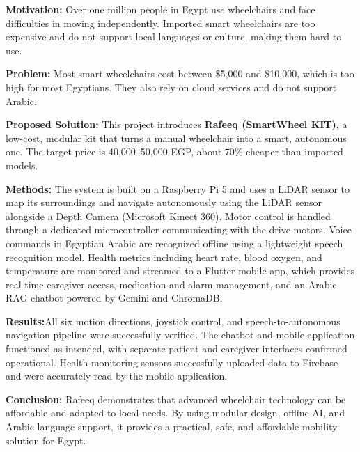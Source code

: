\documentclass[12pt,a4paper]{report}
\begin{document}
\textbf{Motivation:} Over one million people in Egypt use wheelchairs and face difficulties in moving independently. Imported smart wheelchairs are too expensive and do not support local languages or culture, making them hard to use.

\vspace{0.2cm}

\textbf{Problem:} Most smart wheelchairs cost between \$5,000 and \$10,000, which is too high for most Egyptians. They also rely on cloud services and do not support Arabic.

\vspace{0.2cm}

\textbf{Proposed Solution:} This project introduces \textbf{Rafeeq (SmartWheel KIT)}, a low-cost, modular kit that turns a manual wheelchair into a smart, autonomous one. The target price is 40,000--50,000 EGP, about 70\% cheaper than imported models.

\vspace{0.2cm}
\textbf{Methods:} The system is built on a Raspberry Pi 5 and uses a LiDAR sensor to map its surroundings and navigate autonomously using the LiDAR sensor alongside a Depth Camera (Microsoft Kinect 360). Motor control is handled through a dedicated microcontroller communicating with the drive motors. Voice commands in Egyptian Arabic are recognized offline using a lightweight speech recognition model. Health metrics including heart rate, blood oxygen, and temperature are monitored and streamed to a Flutter mobile app, which provides real-time caregiver access, medication and alarm management, and an Arabic RAG chatbot powered by Gemini and ChromaDB.



\vspace{0.2cm}

\textbf{Results:}All six motion directions, joystick control, and speech-to-autonomous navigation pipeline were successfully verified. The chatbot and mobile application functioned as intended, with separate patient and caregiver interfaces confirmed operational. Health monitoring sensors successfully uploaded data to Firebase and were accurately read by the mobile application. 

\vspace{0.2cm}

\textbf{Conclusion:} Rafeeq demonstrates that advanced wheelchair technology can be affordable and adapted to local needs. By using modular design, offline AI, and Arabic language support, it provides a practical, safe, and affordable mobility solution for Egypt.
\end{document}
